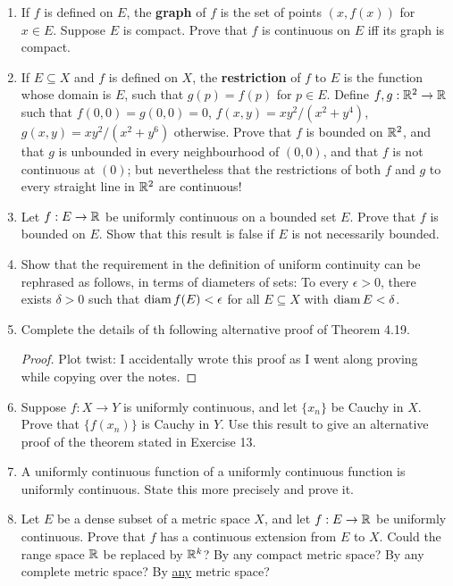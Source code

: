 \begin{enumerate}
\item %
If $f$ is defined on $E$, the \textbf{graph} of $f$ is the set of points $(x, f(x))$ for $x \in E$. Suppose $E$ is compact. Prove that $f$ is continuous on $E$ iff its graph is compact.

\item %
If $E \subseteq X$ and $f$ is defined on $X$, the \textbf{restriction} of $f$ to $E$ is the function whose domain is $E$, such that $g(p) = f(p)$ for $p \in E$. Define $f, g: \mathbb{R}^2 \rightarrow \mathbb{R}$ such that $f(0, 0) = g(0, 0) = 0$, $f(x, y) = xy^2/(x^2 + y^4)$, $g(x, y) = xy^2/(x^2 + y^6)$ otherwise. Prove that $f$ is bounded on $\mathbb{R}^2$, and that $g$ is unbounded in every neighbourhood of $(0, 0)$, and that $f$ is not continuous at $( 0)$; but nevertheless that the restrictions of both $f$ and $g$ to every straight line in $\mathbb{R}^2$ are continuous!

\item %
Let $f: E \rightarrow \mathbb{R}$ be uniformly continuous on a bounded set $E$. Prove that $f$ is bounded on $E$. Show that this result is false if $E$ is not necessarily bounded.

\item %
Show that the requirement in the definition of uniform continuity can be rephrased as follows, in terms of diameters of sets: To every $\epsilon > 0$, there exists $\delta > 0$ such that $\operatorname{diam} f(E) < \epsilon$ for all $E \subseteq X$ with $\operatorname{diam} E < \delta$.

\item %
Complete the details of th following alternative proof of Theorem 4.19.
\begin{proof}
Plot twist: I accidentally wrote this proof as I went along proving while copying over the notes.
\end{proof}

\item %
Suppose $f: X \to Y$ is uniformly continuous, and let $\{x_n\}$ be Cauchy in $X$. Prove that $\{f(x_n)\}$ is Cauchy in $Y$. Use this result to give an alternative proof of the theorem stated in Exercise 13.

\item %
A uniformly continuous function of a uniformly continuous function is uniformly continuous. State this more precisely and prove it.

\item %
Let $E$ be a dense subset of a metric space $X$, and let $f: E \rightarrow \mathbb{R}$ be uniformly continuous. Prove that $f$ has a continuous extension from $E$ to $X$. Could the range space $\mathbb{R}$ be replaced by $\mathbb{R}^k$? By any compact metric space? By any complete metric space? By \underline{any} metric space?


\end{enumerate}
